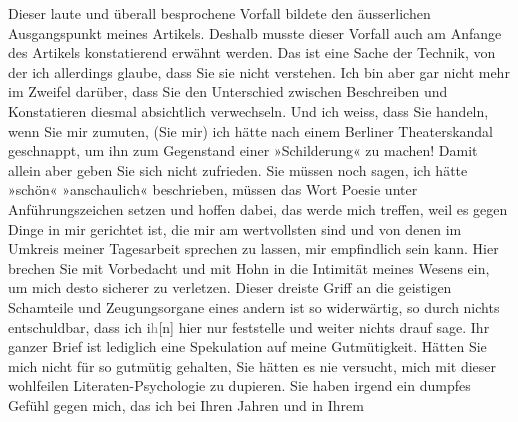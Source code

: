 \begin{ledgroupsized}[t]{13cm}
               Dieser laute und überall besprochene Vorfall bildete den äusserlichen Ausgangspunkt
               meines Artikels. Deshalb
               musste dieser Vorfall auch am Anfange des Artikels konstatierend erwähnt werden. Das ist eine Sache
               der Technik, von der ich allerdings glaube, dass Sie sie nicht verstehen. Ich bin
               aber gar nicht mehr im Zweifel darüber, dass Sie den Unterschied zwischen Beschreiben
               und Konstatieren diesmal absichtlich verwechseln. Und ich weiss, dass Sie \label{K_L03438-12v}\label{K_L03438-12h}
               handeln, wenn Sie mir zumuten, (Sie mir) ich hätte nach einem Berliner Theaterskandal geschnappt, um ihn zum Gegenstand einer
               »Schilderung« zu machen!\pend
           \pstart
           Damit allein aber geben Sie sich nicht zufrieden. Sie müssen noch sagen, ich hätte
               »schön« »anschaulich« beschrieben, müssen das Wort Poesie unter Anführungszeichen
               setzen und hoffen dabei, das werde mich treffen, weil es gegen Dinge in mir gerichtet
               ist, die mir am wertvollsten sind und von denen im Umkreis meiner Tagesarbeit
               sprechen zu lassen, mir empfindlich sein kann. {\pb}Hier brechen Sie mit Vorbedacht
               und mit Hohn in die Intimität meines Wesens ein, um mich desto sicherer zu verletzen.
               Dieser dreiste Griff an die geistigen Schamteile und Zeugungsorgane eines andern ist
               so widerwärtig, so durch nichts entschuldbar, dass ich i\textcolor{gray}{h}{[}n{]} hier nur feststelle und weiter nichts drauf sage.\pend
           \pstart
           Ihr ganzer Brief ist lediglich eine Spekulation auf meine Gutmütigkeit. Hätten Sie
               mich nicht für so gutmütig gehalten, Sie hätten es nie versucht, mich mit dieser
               wohlfeilen Literaten-Psychologie zu dupieren.\pend
           \pstart
           Sie haben irgend ein dumpfes Gefühl gegen mich, das ich bei Ihren Jahren und in Ihrem

\end{ledgroupsized}
